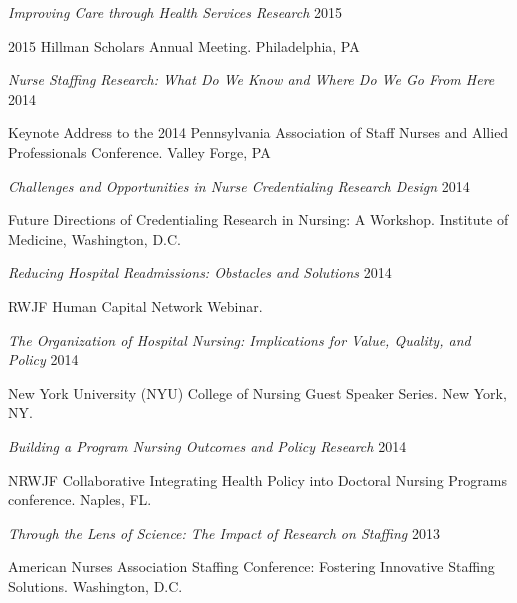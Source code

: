 \documentclass[10pt,]{article}
\begin{document}
{{{{{{{{{{{{{{\begin{hangparas}{.5in}{1}
{\textit {Improving Care through Health Services Research}} \hfill 2015 
\vspace{-2.5mm}
\begin{adjustwidth}{0.5cm}{1cm}
2015 Hillman Scholars Annual Meeting. Philadelphia, PA 
\end{adjustwidth}

{\textit {Nurse Staffing Research: What Do We Know and Where Do We Go From Here}} \hfill 2014 
\vspace{-2.5mm}
\begin{adjustwidth}{0.5cm}{1cm}
Keynote Address to the 2014 Pennsylvania Association of Staff Nurses and Allied Professionals Conference. Valley Forge, PA 
\end{adjustwidth}

{\textit {Challenges and Opportunities in Nurse Credentialing Research Design}} \hfill 2014 
\vspace{-2.5mm}
\begin{adjustwidth}{0.5cm}{1cm}
Future Directions of Credentialing Research in Nursing: A Workshop. Institute of Medicine, Washington, D.C. 
\end{adjustwidth}

{\textit {Reducing Hospital Readmissions: Obstacles and Solutions}} \hfill 2014 
\vspace{-2.5mm}
\begin{adjustwidth}{0.5cm}{1cm}
RWJF Human Capital Network Webinar.
\end{adjustwidth}

{\textit {The Organization of Hospital Nursing: Implications for Value, Quality, and Policy}} \hfill 2014 
\vspace{-2.5mm}
\begin{adjustwidth}{0.5cm}{1cm}
New York University (NYU) College of Nursing Guest Speaker Series. New York, NY.
\end{adjustwidth}

{\textit {Building a Program Nursing Outcomes and Policy Research}} \hfill 2014 
\vspace{-2.5mm}
\begin{adjustwidth}{0.5cm}{1cm}
NRWJF Collaborative Integrating Health Policy into Doctoral Nursing Programs conference. Naples, FL.
\end{adjustwidth}

{\textit {Through the Lens of Science: The Impact of Research on Staffing}} \hfill 2013 
\vspace{-2.5mm}
\begin{adjustwidth}{0.5cm}{1cm}
American Nurses Association Staffing Conference: Fostering Innovative Staffing Solutions. Washington, D.C.
\end{adjustwidth}


\end{hangparas}}}}}}}}}}}}}}}
\end{document}
